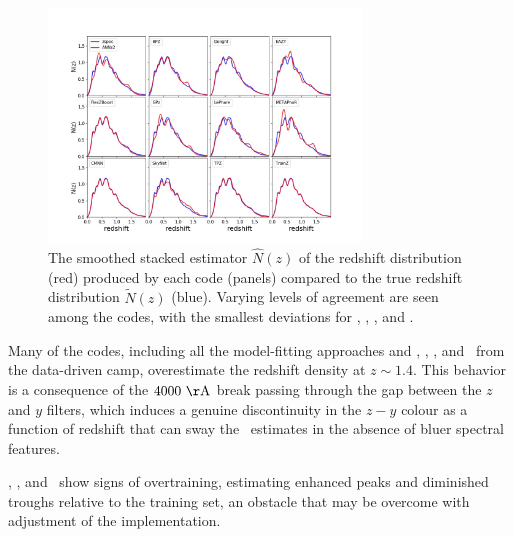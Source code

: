 \begin{figure}
	\centering
	\includegraphics[width=0.74\textwidth]{figures/pzdc1/NZsumplot_12codes_scottsrule.jpg}
	\caption{The smoothed stacked estimator $\hat{N}(z)$ of the redshift distribution (red) produced by each code (panels) compared to the true redshift distribution $\tilde{N}(z)$ (blue).
		Varying levels of agreement are seen among the codes, with the smallest deviations for \cmnn, \flexzboost, \tpz, and \trainz.}
\end{figure}

Many of the codes, including all the model-fitting approaches and \annz, \gpz, \metaphor, and \skynet\ from the data-driven camp, overestimate the redshift density at $z \sim 1.4$.
This behavior is a consequence of the $4000\ {\rm \AA}$ break passing through the gap between the $z$ and $y$ filters, which induces a genuine discontinuity in the $z - y$ colour as a function of redshift that can sway the \pzpdf\ estimates in the absence of bluer spectral features.

\annz, \gpz, and \metaphor\ show signs of overtraining, estimating enhanced peaks and diminished troughs relative to the training set, an obstacle that may be overcome with adjustment of the implementation.

